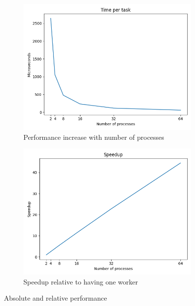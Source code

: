 \documentclass{article}
\begin{document}
\begin{figure}[h!]
    \begin{subfigure}{0.48\textwidth}
        \centering
        \includegraphics[width=\textwidth]{img/task_perf.png}
        \caption{Performance increase with number of processes}
        \label{fig:abs_perf}
    \end{subfigure}
    \begin{subfigure}{0.48\textwidth}
        \centering
        \includegraphics[width=\textwidth]{img/task_speedup.png}
        \caption{Speedup relative to having one worker}
        \label{fig:rel_perf}
    \end{subfigure}
    \caption{Absolute and relative performance}
    \label{fig:perf}
\end{figure}
\end{document}
